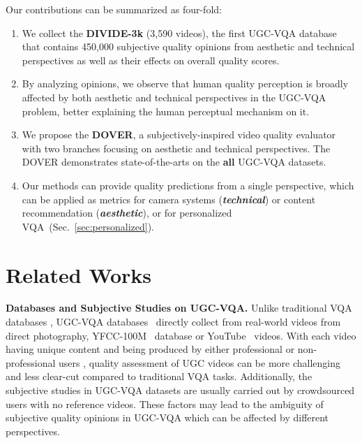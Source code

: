 \documentclass[10pt,twocolumn,letterpaper]{article}
\renewcommand{\paragraph}[1]{\noindent \textbf{#1}}
\newcommand{\blue}[1]{\textbf{\textcolor{mblue}{#1}}}
\newcommand{\green}[1]{\textcolor{mgreen}{#1}}
\begin{document}
Our contributions can be summarized as four-fold:

\begin{enumerate} [topsep=0pt,itemsep=2pt,parsep=0pt]
\renewcommand{\labelenumi}{\theenumi)}
\item We collect the \textbf{DIVIDE-3k} (3,590 videos), the first UGC-VQA database that contains 450,000 subjective quality opinions from aesthetic and technical perspectives as well as their effects on overall quality scores.

\item By analyzing opinions, we observe that human quality perception is broadly affected by both aesthetic and technical perspectives in the UGC-VQA problem, better explaining the human perceptual mechanism on it.


\item We propose the \textbf{DOVER}, a subjectively-inspired video quality evaluator with two branches focusing on aesthetic and technical perspectives. The DOVER demonstrates state-of-the-arts on the \textbf{all} UGC-VQA datasets.

\item Our methods can provide quality predictions from a single perspective, which can be applied as metrics for camera systems (\textbf{\green{\textit{technical}}}) or content recommendation (\blue{\textit{aesthetic}}), or for personalized VQA~(Sec.~\ref{sec:personalized}).










\end{enumerate}








\section{Related Works}






\paragraph{Databases and Subjective Studies on UGC-VQA.} 
 Unlike traditional VQA databases \cite{livevqa,csiqvqa,cvd,qualcomm}, UGC-VQA databases~\cite{pvq,vqc,kv1k,ytugccc} directly collect from real-world videos from direct photography, YFCC-100M~\cite{yfcc} database or YouTube~\cite{ytugc} videos. With each video having unique content and being produced by either professional or non-professional users \cite{rfugc,internetvqa}, quality assessment of UGC videos can be more challenging and less clear-cut compared to traditional VQA tasks. Additionally, the subjective studies in UGC-VQA datasets are usually carried out by crowdsourced users \cite{crowdsource} with no reference videos. These factors may lead to the ambiguity of subjective quality opinions in UGC-VQA which can be affected by different perspectives.
\end{document}
